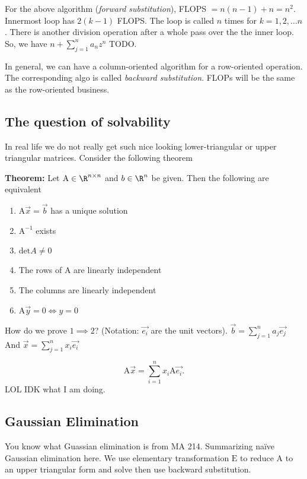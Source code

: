 \documentclass[a4paper]{article}
\begin{document}


For the above algorithm (\emph{forward substitution}), FLOPS $= n(n-1) + n = n^2$.
Innermost loop has $2(k-1)$ FLOPS. The loop is called $n$ times for
$k = 1,2,\ldots n$. There is another division operation after a whole
pass over the the inner loop. So, we have $n + \sum_{j=1}^{n} a_n z^n$ TODO. %

In general, we can have a column-oriented algorithm for a row-oriented
operation. The corresponding algo is called \emph{backward substitution}. 
FLOPs will be the same as the row-oriented business.

\subsection*{The question of solvability}
In real life we do not really get such nice looking lower-triangular
or upper triangular matrices. Consider the following theorem

\textbf{Theorem:} Let $\mathrm A \in \R^{n\times n}$ and $b \in  \R^{n}$ be given. Then the following are equivalent
\begin{enumerate}
	\item $\mathrm A \vec{x}= \vec{b}$ has a unique solution
	\item $\mathrm A^{-1}$ exists
	\item $\text{det} A \neq 0$ 
	\item The rows of $\mathrm A$ are linearly independent
	\item The columns are linearly independent
	\item $\mathrm A\vec{y} = 0 \iff y = 0$
\end{enumerate}
How do we prove $1 \implies 2$? (Notation: $\vec{e_i}$ are the unit vectors).
$\vec{b} = \sum_{j=1}^{n} a_j\vec{e_j}$ And $\vec{x} = \sum_{j=1}^{n} x_i \vec{e_i}$

\[
	\mathrm A \vec{x} = \sum_{i=1}^{n} x_i \mathrm{A}\vec{e_i}
.\] 
LOL IDK what I am doing. %

\subsection*{Gaussian Elimination}
You know what Guassian elimination is from MA 214. Summarizing
na\"ive Gaussian elimination here. We use elementary transformation
$\mathrm{E}$ to reduce $\mathrm{A}$ to an upper triangular form
and solve then use backward substitution.
\end{document}
